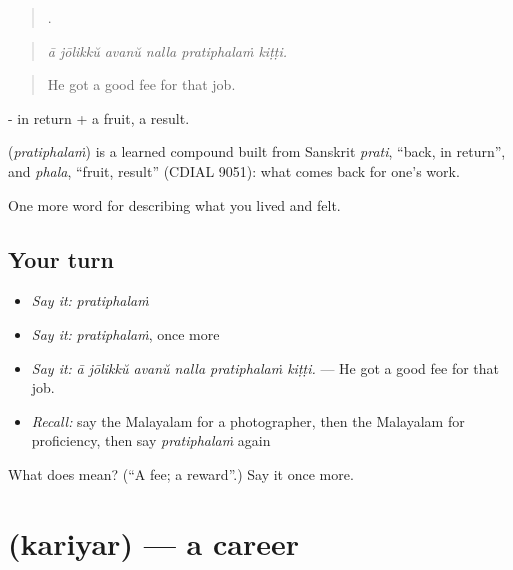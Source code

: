 \begin{quote}
     .
\end{quote}

\begin{quote}
\emph{ā jōlikkŭ avanŭ nalla pratiphalaṁ kiṭṭi.}
\end{quote}

\begin{quote}
He got a good fee for that job.
\end{quote}

- in return +  a fruit, a result.

\begin{cousinweb}
\textbf{} (\emph{pratiphalaṁ}) is a learned compound built from Sanskrit \emph{prati}, \textquotedblleft{}back, in return\textquotedblright{}, and \emph{phala}, \textquotedblleft{}fruit, result\textquotedblright{} (CDIAL 9051): what comes back for one's work.
\end{cousinweb}

\begin{grammarlens}[title={What you've built}]
One more word for describing what you lived and felt.
\end{grammarlens}

\subsection*{Your turn}
\begin{itemize}
\raggedright
  \item \emph{Say it:} \emph{pratiphalaṁ}
  \item \emph{Say it:} \emph{pratiphalaṁ}, once more
  \item \emph{Say it:} \emph{ā jōlikkŭ avanŭ nalla pratiphalaṁ kiṭṭi.} — He got a good fee for that job.
  \item \emph{Recall:} say the Malayalam for a photographer, then the Malayalam for proficiency, then say \emph{pratiphalaṁ} again
\end{itemize}

\begin{tcolorbox}[breakable,colback=teal!4,colframe=teal!35!black,title={Before you move on}]
What does  mean? (\textquotedblleft{}A fee; a reward\textquotedblright{}.) Say it once more.
\end{tcolorbox}
\section[\texorpdfstring{\ml{കരിയർ} (kariyar)}{കരിയർ (kariyar)}]{ (kariyar) — a career}

